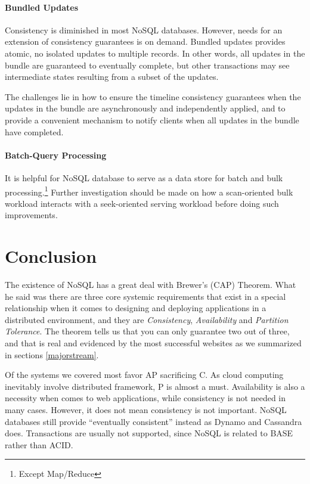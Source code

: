 \documentclass[letter,twocolumn]{article}
\begin{document}
\paragraph*{Bundled Updates} 
Consistency is diminished in most NoSQL databases. However, needs for an extension of consistency guarantees is on demand. Bundled updates provides atomic, no isolated updates to multiple records. In other words, all updates in the bundle are guaranteed to eventually complete, but other transactions may see intermediate states resulting from a subset of the updates. 

The challenges lie in how to ensure the timeline consistency guarantees when the updates in the bundle are asynchronously and independently applied, and to provide a convenient mechanism to notify clients when all updates in the bundle have completed.

\paragraph*{Batch-Query Processing}
It is helpful for NoSQL database to serve as a data store for batch and bulk processing.\footnote{Except Map/Reduce} Further investigation should be made on how a scan-oriented bulk workload interacts with a seek-oriented serving workload before doing such improvements.

\section{Conclusion}
The existence of NoSQL has a great deal with Brewer's (CAP) Theorem.\citep{Browne2009} What he said was there are three core systemic requirements that exist in a special relationship when it comes to designing and deploying applications in a distributed environment, and they are \textit{Consistency}, \textit{Availability} and \textit{Partition Tolerance}. The theorem tells us that you can only guarantee two out of three, and that is real and evidenced by the most successful websites as we summarized in sections \ref{majorstream}.

Of the systems we covered most favor AP sacrificing C. As cloud computing inevitably involve distributed framework, P is almost a must. Availability is also a necessity when comes to web applications, while consistency is not needed in many cases. However, it does not mean consistency is not important. NoSQL databases still provide ``eventually consistent'' instead as Dynamo and Cassandra does. Transactions are usually not supported, since NoSQL is related to BASE rather than ACID.
\end{document}
